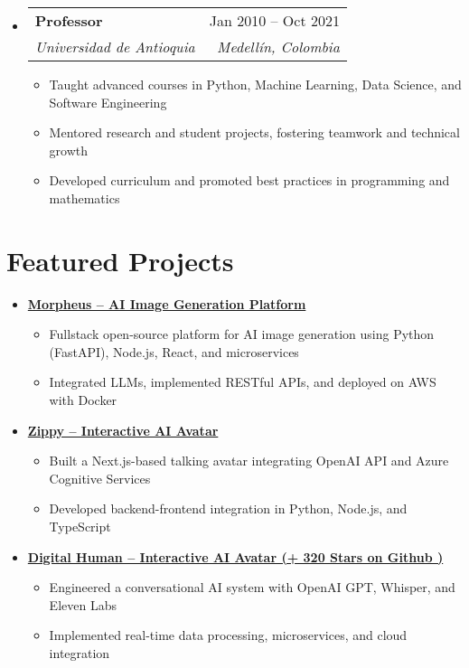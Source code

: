 \documentclass[letterpaper,11pt]{article}
\makeatletter
\newcommand{\resumeSubheading}[4]{
  \vspace{-2pt}
  \item[]
  \begin{tabular*}{\textwidth}{@{\extracolsep{\fill}}l r}
    \textbf{#1} & #2 \\
    \textit{#3} & \textit{#4} \\
  \end{tabular*}
  \vspace{-5pt}
}
\newcommand{\normalfaExternalLink}{{\mdseries\faExternalLink}}
\makeatother
\begin{document}
\begin{itemize}[leftmargin=0pt, itemindent=0pt, label={}]
\resumeSubheading
{Professor}{Jan 2010 -- Oct 2021}
{Universidad de Antioquia}{Medellín, Colombia}
\begin{itemize}[leftmargin=*]
    \item Taught advanced courses in Python, Machine Learning, Data Science, and Software Engineering
    \item Mentored research and student projects, fostering teamwork and technical growth
    \item Developed curriculum and promoted best practices in programming and mathematics
\end{itemize}
\end{itemize}

\section{Featured Projects}
\begin{itemize}[leftmargin=*]
    \item \textbf{\href{https://github.com/Monadical-SAS/Morpheus}{Morpheus -- AI Image Generation Platform \normalfaExternalLink}}
    \begin{itemize}
        \item Fullstack open-source platform for AI image generation using Python (FastAPI), Node.js, React, and microservices
        \item Integrated LLMs, implemented RESTful APIs, and deployed on AWS with Docker
    \end{itemize}
    \item \textbf{\href{https://github.com/asanchezyali/ai-avatar}{Zippy -- Interactive AI Avatar \normalfaExternalLink}}
    \begin{itemize}
        \item Built a Next.js-based talking avatar integrating OpenAI API and Azure Cognitive Services
        \item Developed backend-frontend integration in Python, Node.js, and TypeScript
    \end{itemize}
    \item \textbf{\href{https://github.com/asanchezyali/talking-avatar-with-ai}{Digital Human -- Interactive AI Avatar (+
        320 Stars on Github )\normalfaExternalLink}}
    \begin{itemize}
        \item Engineered a conversational AI system with OpenAI GPT, Whisper, and Eleven Labs
        \item Implemented real-time data processing, microservices, and cloud integration
    \end{itemize}
\end{itemize}
\end{document}
